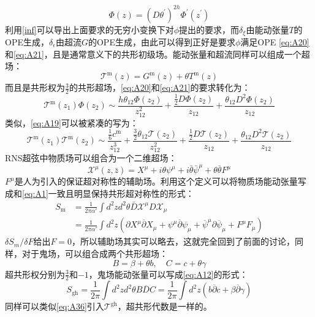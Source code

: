 \begin{equation}
	\Phi(z)=(D\theta^{\prime})^{2h}\Phi^{\prime}(z^{\prime})
\end{equation}
利用\ref{inf}可以导出上面要求的无穷小变换下对$\phi$提出的要求，而$\delta_\xi$由能动张量$T$的OPE生成，$\delta_\epsilon$由超流$G$的OPE生成，由此可以得到正好是要求$\phi$满足OPE \ref{eq:A20}和\ref{eq:A21}，且是通常意义下的共形初级场。能动张量和超流同样可以组成一个超场：
\begin{equation}
	\label{eq:A36}
	\mathscr{T}^\text{m}(z)=G^\text{m}(z)+\theta T^\text{m}(z)
\end{equation}
而且是共形权为$\frac32$的共形超场，\ref{eq:A20}和\ref{eq:A21}的要求转化为：
\begin{equation}
	\mathscr{T}^{\text{m}}(z_1)\Phi(z_2)\sim\frac{h\theta_{12}\Phi(z_2)}{z_{12}^2}+\frac{\frac{1}{2}D\Phi(z_2)}{z_{12}}+\frac{\theta_{12}D^2\Phi(z_2)}{z_{12}}
\end{equation}
类似，\ref{eq:A19}可以被紧凑的写为：
\begin{equation}
	\mathscr{T}^\text{m}(z_1)\mathscr{T}^\text{m}(z_2)\sim\frac{\frac{1}{6}{c^\text{m}}}{z_{12}^3}+\frac{\frac{3}{2}\theta_{12}\mathscr{T}(z_2)}{z_{12}^2}+\frac{\frac{1}{2}D\mathscr{T}(z_2)}{z_{12}}+\frac{\theta_{12}D^2\mathscr{T}(z_2)}{z_{12}}
\end{equation}
RNS超弦中物质场可以组合为一个二维超场：
\begin{equation}
	\mathscr{X}^\mu(z,\bar{z})=X^\mu+i\theta\psi^\mu+i\bar{\theta}\bar{\psi}^\mu+\theta\bar{\theta}F^\mu
\end{equation}
$F^\mu$是人为引入的保证超对称性的辅助场。利用这个定义可以将物质场能动张量写成和\ref{eq:A1}一致且明显保持共形超对称性的形式：
\begin{equation}
	\begin{aligned}
		S_\text{m}&=\frac{1}{2\pi\alpha'}\int d^2zd^2\theta\bar{D}\mathscr{X}^\mu D\mathscr{X}_\mu\\&=\frac{1}{2\pi\alpha'}\int d^2z\left(\partial X^\mu\overline{\partial}X_\mu+\psi^\mu\overline{\partial}\psi_\mu+\overline{\psi}^\mu\partial\overline{\psi}_\mu+F^\mu F_\mu\right)
	\end{aligned}
\end{equation}
$\delta S_m/\delta F$给出$F=0$，所以辅助场其实可以略去，这就完全回到了前面的讨论，同样，对于鬼场，可以组合成两个共形超场：
\begin{equation}
	B=\beta+\theta b,\quad C=c+\theta\gamma
\end{equation}
超共形权分别为$\frac32$和$-1$，鬼场能动张量可以写成\ref{eq:A12}的形式：
\begin{equation}
	S_{\text{gh}}=\frac{1}{2\pi}\int d^2zd^2\theta B\overline{D}C=\frac{1}{2\pi}\int d^2z(b\overline{\partial}c+\beta\overline{\partial}\gamma)
\end{equation}
同样可以类似\ref{eq:A36}引入$\mathscr{T}^{\text{gh}}$，超共形代数是一样的。
